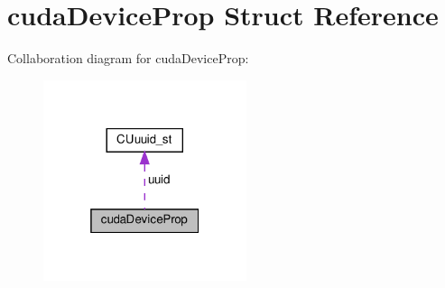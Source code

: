 \hypertarget{structcudaDeviceProp}{}\section{cuda\+Device\+Prop Struct Reference}
\label{structcudaDeviceProp}


Collaboration diagram for cuda\+Device\+Prop\+:\nopagebreak
\begin{figure}[H]
\begin{center}
\leavevmode
\includegraphics[width=169pt]{structcudaDeviceProp__coll__graph}
\end{center}
\end{figure}

